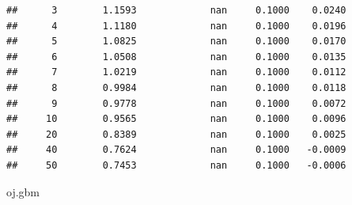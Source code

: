 \documentclass[]{book}
\newenvironment{Shaded}{\begin{snugshade}}{\end{snugshade}}
\newcommand{\NormalTok}[1]{#1}
\begin{document}
\begin{verbatim}
##      3        1.1593             nan     0.1000    0.0240
##      4        1.1180             nan     0.1000    0.0196
##      5        1.0825             nan     0.1000    0.0170
##      6        1.0508             nan     0.1000    0.0135
##      7        1.0219             nan     0.1000    0.0112
##      8        0.9984             nan     0.1000    0.0118
##      9        0.9778             nan     0.1000    0.0072
##     10        0.9565             nan     0.1000    0.0096
##     20        0.8389             nan     0.1000    0.0025
##     40        0.7624             nan     0.1000   -0.0009
##     50        0.7453             nan     0.1000   -0.0006
\end{verbatim}

\begin{Shaded}
\begin{Highlighting}[]
\NormalTok{oj.gbm}
\end{Highlighting}
\end{Shaded}
\end{document}
